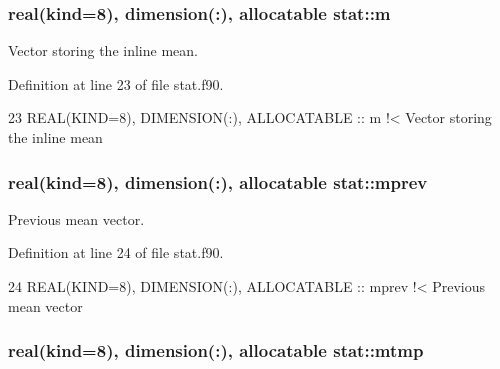 \subsubsection[{\texorpdfstring{m}{m}}]{\setlength{\rightskip}{0pt plus 5cm}real(kind=8), dimension(\+:), allocatable stat\+::m\hspace{0.3cm}{\ttfamily [private]}}\hypertarget{namespacestat_a2416f75ad24ac05a0ba615f9c8d467db}{}\label{namespacestat_a2416f75ad24ac05a0ba615f9c8d467db}


Vector storing the inline mean. 



Definition at line 23 of file stat.\+f90.


\begin{DoxyCode}
23   \textcolor{keywordtype}{REAL(KIND=8)}, \textcolor{keywordtype}{DIMENSION(:)}, \textcolor{keywordtype}{ALLOCATABLE} :: m\textcolor{comment}{       !< Vector storing the inline mean}
\end{DoxyCode}
\subsubsection[{\texorpdfstring{mprev}{mprev}}]{\setlength{\rightskip}{0pt plus 5cm}real(kind=8), dimension(\+:), allocatable stat\+::mprev\hspace{0.3cm}{\ttfamily [private]}}\hypertarget{namespacestat_adcf5178f8d91cdc53ff5f28cc3e04689}{}\label{namespacestat_adcf5178f8d91cdc53ff5f28cc3e04689}


Previous mean vector. 



Definition at line 24 of file stat.\+f90.


\begin{DoxyCode}
24   \textcolor{keywordtype}{REAL(KIND=8)}, \textcolor{keywordtype}{DIMENSION(:)}, \textcolor{keywordtype}{ALLOCATABLE} :: mprev\textcolor{comment}{   !< Previous mean vector}
\end{DoxyCode}
\subsubsection[{\texorpdfstring{mtmp}{mtmp}}]{\setlength{\rightskip}{0pt plus 5cm}real(kind=8), dimension(\+:), allocatable stat\+::mtmp\hspace{0.3cm}{\ttfamily [private]}}\hypertarget{namespacestat_a24c9afb1c1c6692185b509fd364508c8}{}\label{namespacestat_a24c9afb1c1c6692185b509fd364508c8}


